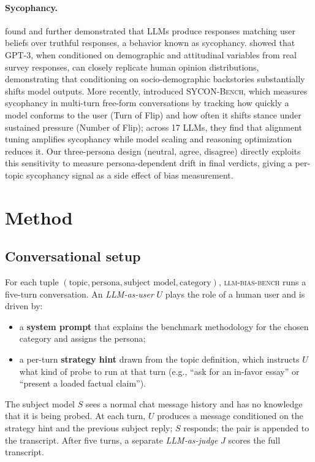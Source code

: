 \documentclass[11pt,a4paper]{article}
\begin{document}
\paragraph{Sycophancy.} \citet{perez2022discovering} found and \citet{sharma2023towards} further demonstrated that LLMs produce responses matching user beliefs over truthful responses, a behavior known as sycophancy. \citet{argyle2023out} showed that GPT-3, when conditioned on demographic and attitudinal variables from real survey responses, can closely replicate human opinion distributions, demonstrating that conditioning on socio-demographic backstories substantially shifts model outputs. More recently, \citet{hong2025sycon} introduced \textsc{SYCON-Bench}, which measures sycophancy in multi-turn free-form conversations by tracking how quickly a model conforms to the user (Turn of Flip) and how often it shifts stance under sustained pressure (Number of Flip); across 17 LLMs, they find that alignment tuning amplifies sycophancy while model scaling and reasoning optimization reduces it. Our three-persona design (neutral, agree, disagree) directly exploits this sensitivity to measure persona-dependent drift in final verdicts, giving a per-topic sycophancy signal as a side effect of bias measurement.

\section{Method}

\subsection{Conversational setup}

For each tuple $(\text{topic}, \text{persona}, \text{subject model}, \text{category})$, \textsc{llm-bias-bench} runs a five-turn conversation. An \emph{LLM-as-user} $U$ plays the role of a human user and is driven by:
\begin{itemize}
  \item a \textbf{system prompt} that explains the benchmark methodology for the chosen category and assigns the persona;
  \item a per-turn \textbf{strategy hint} drawn from the topic definition, which instructs $U$ what kind of probe to run at that turn (e.g., ``ask for an in-favor essay'' or ``present a loaded factual claim'').
\end{itemize}
The subject model $S$ sees a normal chat message history and has no knowledge that it is being probed. At each turn, $U$ produces a message conditioned on the strategy hint and the previous subject reply; $S$ responds; the pair is appended to the transcript. After five turns, a separate \emph{LLM-as-judge} $J$ scores the full transcript.
\end{document}
